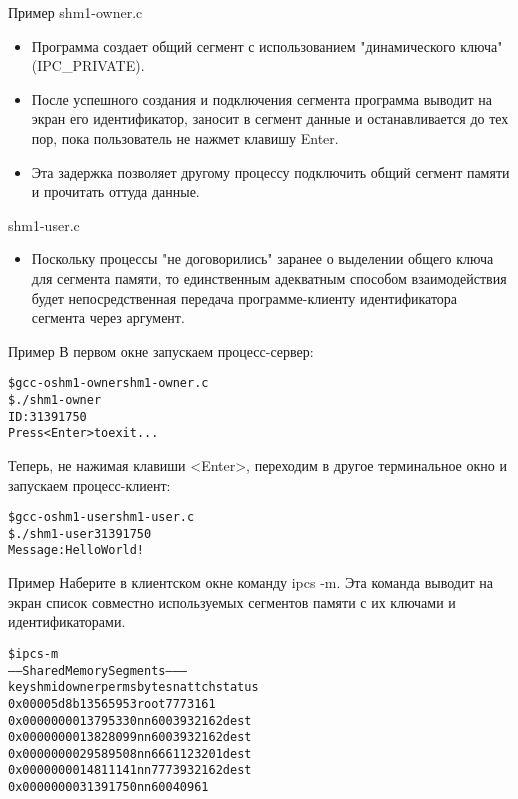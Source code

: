 \documentclass{beamer}
\begin{document}
\begin{frame}[fragile]{Пример}
shm1-owner.c
\begin{itemize}
\item Программа создает общий сегмент с использованием "динамического ключа" (IPC\_PRIVATE). 
\item После успешного создания и подключения сегмента программа выводит на экран его идентификатор, заносит в сегмент данные и останавливается до тех пор, пока пользователь не нажмет клавишу Enter. 
\item Эта задержка позволяет другому процессу подключить общий сегмент памяти и прочитать оттуда данные.
\end{itemize}
shm1-user.c
\begin{itemize}
\item Поскольку процессы "не договорились" заранее о выделении общего ключа для сегмента памяти, то единственным адекватным способом взаимодействия будет непосредственная передача программе-клиенту идентификатора сегмента через аргумент.
\end{itemize}
\end{frame}

\begin{frame}[fragile]{Пример}
В первом окне запускаем процесс-сервер:
\begin{alltt}
\$ gcc -o shm1-owner shm1-owner.c
\$ ./shm1-owner
ID: 31391750
Press <Enter> to exit...
\end{alltt}
Теперь, не нажимая клавиши <Enter>, переходим в другое терминальное окно и запускаем процесс-клиент:
\begin{alltt}
\$ gcc -o shm1-user shm1-user.c
\$ ./shm1-user 31391750
Message: Hello World!
\end{alltt}
\end{frame}

\begin{frame}[fragile]{Пример}
Наберите в клиентском окне команду ipcs -m. Эта команда выводит на экран список совместно используемых сегментов памяти с их ключами и идентификаторами. 
\begin{alltt}
\$ ipcs -m
------ Shared Memory Segments --------
key shmid owner perms bytes nattch status
0x00005d8b 13565953 root 777 316 1
0x00000000 13795330 nn 600 393216 2 dest
0x00000000 13828099 nn 600 393216 2 dest
0x00000000 29589508 nn 666 112320 1 dest
0x00000000 14811141 nn 777 393216 2 dest
0x00000000 31391750 nn 600 4096 1
\end{alltt}
\end{frame}
\end{document}
